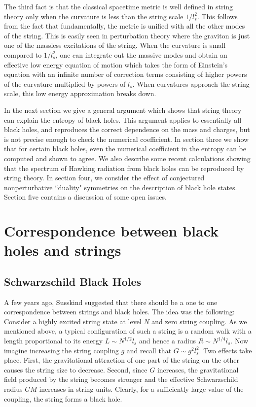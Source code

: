 \documentclass[12pt]{article}
\newcommand{\sect}[1]{\section{#1}\setcounter{equation}{0}}
\begin{document}
The third fact is that the classical
spacetime metric
is well defined in string theory only when the curvature is less than
the string scale $1/l_s^2$. This follows from the fact that fundamentally,
the metric is
unified with all the other modes of the string. This is easily seen in
perturbation theory where the graviton is just one of the massless excitations
of the string. When the curvature is small compared to $1/l_s^2$,
one can integrate out the massive modes and obtain an effective low
energy 
equation of motion which  takes the form of Einstein's equation with an infinite
number of correction terms consisting of higher powers of the curvature
multiplied by powers of $l_s$.  When curvatures approach the string scale,
this low energy approximation breaks down.

In the next section we give a general argument which shows that 
string theory can explain the entropy of black holes. This argument
applies to essentially all black holes, and reproduces the correct dependence
on the mass and charges, but is not precise enough
to check the numerical coefficient. In section three we show that for
certain black holes, even the numerical coefficient in the entropy can
be computed and shown to agree. We also describe some recent calculations
showing that the spectrum of Hawking radiation from black holes can be 
reproduced by
string theory. In section four, we consider the effect of conjectured
nonperturbative ``duality" symmetries  on the description of black hole states. 
Section five contains a discussion of some open issues.


\sect{Correspondence between black holes and strings}

\subsection{Schwarzschild Black Holes}

A few years ago, Susskind \cite{suss1}
suggested that there should be a one to one
correspondence between strings and black holes. The idea was the following:
Consider a  highly excited string state at level $N$ and
zero string coupling. As we mentioned above, 
a typical
configuration of such a string is a random walk with a length  proportional
to its energy $L\sim N^{1/2} l_s$ and hence a radius $R\sim N^{1/4} l_s$. 
 Now imagine
increasing the string coupling $g$ and recall that $G \sim g^2 l_s^2$.
Two effects take place. First,
the gravitational attraction of one part of the string on the other
causes the string size to  decrease. 
Second, since $G$ increases, the gravitational field produced by the string
becomes stronger and the effective
Schwarzschild radius  $GM$ increases in string units. Clearly, for a 
sufficiently large  value of the
coupling, the string forms a black hole. 
\end{document}
